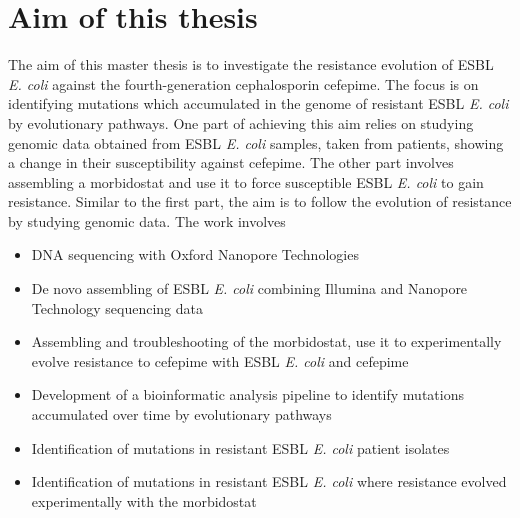 \section{Aim of this thesis}
The aim of this master thesis is to investigate the resistance evolution of ESBL \textit{E. coli} against the fourth-generation cephalosporin cefepime. The focus is on identifying mutations which accumulated in the genome of resistant ESBL \textit{E. coli} by evolutionary pathways. One part of achieving this aim relies on studying genomic data obtained from ESBL \textit{E. coli} samples, taken from patients, showing a change in their susceptibility against cefepime. The other part involves assembling a morbidostat and use it to force susceptible ESBL \textit{E. coli} to gain resistance. Similar to the first part, the aim is to follow the evolution of resistance by studying genomic data. The work involves
\begin{itemize}
	\item DNA sequencing with Oxford Nanopore Technologies
	\item De novo assembling of ESBL \textit{E. coli} combining Illumina and Nanopore Technology sequencing data
	\item Assembling and troubleshooting of the morbidostat, use it to experimentally evolve resistance to cefepime with ESBL \textit{E. coli} and cefepime
	\item Development of a bioinformatic analysis pipeline to identify mutations accumulated over time by evolutionary pathways
	\item Identification of mutations in resistant ESBL \textit{E. coli} patient isolates
	\item Identification of mutations in resistant ESBL \textit{E. coli} where resistance evolved experimentally with the morbidostat
\end{itemize}  
